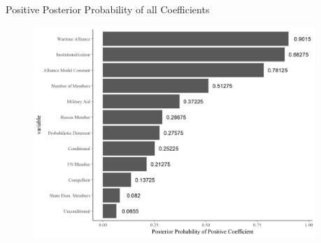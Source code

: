 \documentclass{beamer}
\begin{document}

\begin{frame}{Positive Posterior Probability of all Coefficients}

\begin{figure}
	\centering
		\includegraphics[width=0.95\textwidth]{post-prob-beta.png}
	\label{fig:post-prob-beta}
\end{figure}


\end{frame}

\end{document}
